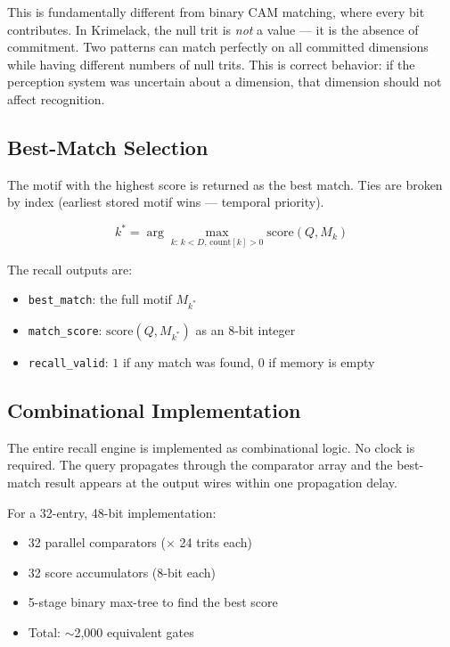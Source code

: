 \documentclass[11pt, a4paper]{article}
\begin{document}
This is fundamentally different from binary CAM matching, where
every bit contributes. In Krimelack, the null trit is \textit{not}
a value --- it is the absence of commitment. Two patterns can
match perfectly on all committed dimensions while having different
numbers of null trits. This is correct behavior: if the perception
system was uncertain about a dimension, that dimension should not
affect recognition.

\subsection{Best-Match Selection}

The motif with the highest score is returned as the best match.
Ties are broken by index (earliest stored motif wins --- temporal
priority).

\begin{equation}
  k^* = \arg\max_{k:\, k < D,\, \text{count}[k] > 0}
  \text{score}(Q, M_k)
\end{equation}

The recall outputs are:
\begin{itemize}[nosep]
  \item \texttt{best\_match}: the full motif $M_{k^*}$
  \item \texttt{match\_score}: $\text{score}(Q, M_{k^*})$
        as an 8-bit integer
  \item \texttt{recall\_valid}: $1$ if any match was found,
        $0$ if memory is empty
\end{itemize}

\subsection{Combinational Implementation}

The entire recall engine is implemented as combinational logic.
No clock is required. The query propagates through the comparator
array and the best-match result appears at the output wires
within one propagation delay.

For a 32-entry, 48-bit implementation:
\begin{itemize}[nosep]
  \item 32 parallel comparators ($\times$ 24 trits each)
  \item 32 score accumulators (8-bit each)
  \item 5-stage binary max-tree to find the best score
  \item Total: $\sim$2,000 equivalent gates
\end{itemize}
\end{document}
